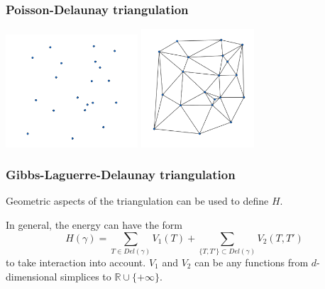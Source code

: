 \documentclass[c, 10pt]{beamer}
\begin{document}
\begin{frame}\frametitle{Poisson-Delaunay triangulation}


\begin{center}
\includegraphics[height = 4.2cm]{./FigureLayout/DelaunayBare.png}
\includegraphics[height = 4.4cm]{./FigureLayout/Delaunay.png}
\end{center}
\end{frame}



\begin{frame}\frametitle{Gibbs-Laguerre-Delaunay triangulation}
\vspace{4mm}

Geometric aspects of the triangulation can be used to define $H$.

In general, the energy can have the form
$$H(\gamma) = \sum_{T \in Del(\gamma)} V_1(T) + \sum_{\{T,T'\} \subset Del (\gamma)} V_2(T,T')$$
to take interaction into account. 
$V_1$ and $V_2$ can be any functions from $d$-dimensional simplices to $\mathbb R \cup \{+ \infty \}$. \newline

\end{frame}
\end{document}
